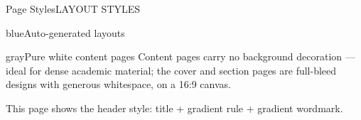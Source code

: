 \documentclass[10pt,aspectratio=169]{beamer}
\begin{document}
\begin{frame}{Page Styles}{LAYOUT STYLES}
  \vspace{1mm}
  \begin{minipage}[t]{0.48\textwidth}
    \vspace{0pt}%
    \begin{cuhkbox}{blue}{Auto-generated layouts}
      {\small
      }
    \end{cuhkbox}
  \end{minipage}\hfill
  \begin{minipage}[t]{0.48\textwidth}
    \vspace{0pt}%
  \end{minipage}
  \vspace{1.2mm}
  \begin{cuhkbox}{gray}{Pure white content pages}
    {\small Content pages carry no background decoration --- ideal for dense
    academic material; the cover and section pages are full-bleed
    designs with generous whitespace, on a 16:9 canvas.}
  \end{cuhkbox}
  \begin{takeaway}
    This page shows the header style: title + gradient rule + gradient wordmark.
  \end{takeaway}
\end{frame}
\end{document}

